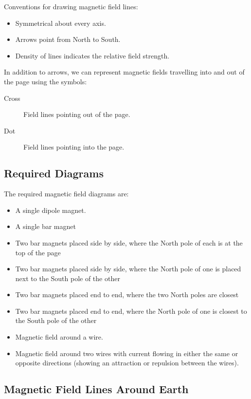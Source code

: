 \documentclass[a4paper,11pt]{report}
\begin{document}
Conventions for drawing magnetic field lines:

\begin{itemize}
\item Symmetrical about every axis.
\item Arrows point from North to South.
\item Density of lines indicates the relative field strength.
\end{itemize}

In addition to arrows, we can represent magnetic fields travelling into and
out of the page using the symbols:

\begin{description}
\item [Cross] Field lines pointing out of the page.
\item [Dot] Field lines pointing into the page.
\end{description}

\subsection{Required Diagrams}

The required magnetic field diagrams are:

\begin{itemize}
\item A single dipole magnet.
\item A single bar magnet
\item Two bar magnets placed side by side, where the North pole of each is at
	the top of the page
\item Two bar magnets placed side by side, where the North pole of one is placed
	next to the South pole of the other
\item Two bar magnets placed end to end, where the two North poles are closest
\item Two bar magnets placed end to end, where the North pole of one is closest
	to the South pole of the other
\item Magnetic field around a wire.
\item Magnetic field around two wires with current flowing in either the same
	or opposite directions (showing an attraction or repulsion between the
	wires).
\end{itemize}

\subsection{Magnetic Field Lines Around Earth}
\end{document}
